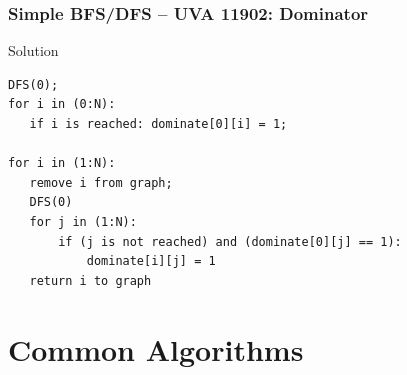 \documentclass{beamer}
\begin{document}
\begin{frame}[fragile]
  \frametitle{Simple BFS/DFS -- UVA 11902: Dominator}
  
  {\smaller
  \begin{exampleblock}{Solution}
\begin{verbatim}
DFS(0); 
for i in (0:N): 
   if i is reached: dominate[0][i] = 1;

for i in (1:N):
   remove i from graph;
   DFS(0)
   for j in (1:N):
       if (j is not reached) and (dominate[0][j] == 1):
           dominate[i][j] = 1
   return i to graph

\end{verbatim}
  \end{exampleblock}}
  
  \begin{center}
  \end{center}
\end{frame}

\section{Common Algorithms}
\end{document}
